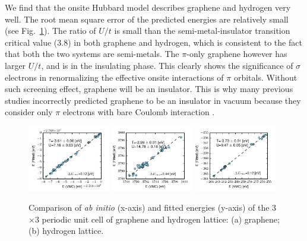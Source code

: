 We find that the onsite Hubbard model describes graphene and hydrogen very well. The root mean square error of the predicted energies are relatively small (see Fig.~\ref{fig:ne_aidmd_gh}). The ratio of $U/t$ is small than the semi-metal-insulator transition critical value (3.8) in both graphene and hydrogen, which is consistent to the fact that both the two systems are semi-metals.  The $\pi$-only graphene however has larger $U/t$, and is in the insulating phase. This clearly shows the significance of $\sigma$ electrons in renormalizing the effective onsite interactions of $\pi$ orbitals. Without such screening effect, graphene will be an insulator. This is why many previous studies incorrectly predicted graphene to be an insulator in vacuum because they consider only $\pi$ electrons with bare Coulomb interaction \cite{DrutPRL2009, DrutPRB2009,  Smith2014}.

\begin{figure}[htb]
\centering
\includegraphics[width=0.32\textwidth]{./Figures/grp_all_tu.pdf}
\includegraphics[width=0.32\textwidth]{./Figures/grp_pi_tu.pdf}
\includegraphics[width=0.32\textwidth]{./Figures/h_tu.pdf}
\caption{Comparison of \textit{ab initio} (x-axis) and fitted energies (y-axis) of the 3$\times$3 periodic unit cell of graphene and hydrogen lattice: (a) graphene; (b) hydrogen lattice.}\label{fig:ne_aidmd_gh}
\end{figure}

